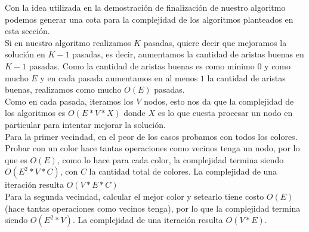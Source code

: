 Con la idea utilizada en la demostración de finalización de nuestro algoritmo podemos generar una cota para la complejidad de los algoritmos planteados en esta sección. \\
Si en nuestro algoritmo realizamos $K$ pasadas, quiere decir que mejoramos la solución en $K - 1$ pasadas, es decir, aumentamos la cantidad de aristas buenas en $K - 1$ pasadas. Como la cantidad de aristas buenas es como mínimo $0$ y como mucho $E$ y en cada pasada aumentamos en al menos $1$ la cantidad de aristas buenas, realizamos como mucho $O(E)$ pasadas. \\
Como en cada pasada, iteramos los $V$ nodos, esto nos da que la complejidad de los algoritmos es $O(E * V * X)$ donde $X$ es lo que cuesta procesar un nodo en particular para intentar mejorar la solución. \\

Para la primer vecindad, en el peor de los casos probamos con todos los colores. Probar con un color hace tantas operaciones como vecinos tenga un nodo, por lo que es $O(E)$, como lo hace para cada color, la complejidad termina siendo $O(E^2 * V * C)$, con  $C$ la cantidad total de colores. La complejidad de una iteración resulta $O(V * E * C)$\\

Para la segunda vecindad, calcular el mejor color y setearlo tiene costo $O(E)$ (hace tantas operaciones como vecinos tenga), por lo que la complejidad termina siendo $O(E^2 * V)$. La complejidad de una iteración resulta $O(V * E)$. \\
